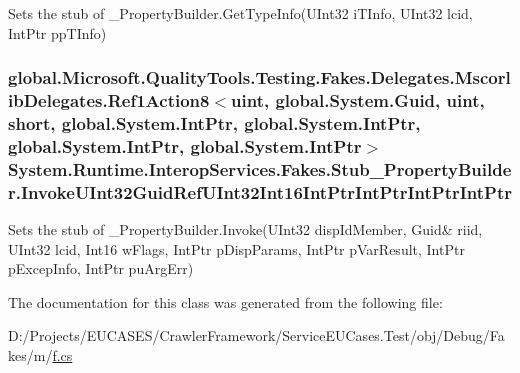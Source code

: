 Sets the stub of \-\_\-\-Property\-Builder.\-Get\-Type\-Info(\-U\-Int32 i\-T\-Info, U\-Int32 lcid, Int\-Ptr pp\-T\-Info)

\hypertarget{class_system_1_1_runtime_1_1_interop_services_1_1_fakes_1_1_stub___property_builder_a7215419c230793c88c0b832f5a5a89f8}{
\subsubsection[{Invoke\-U\-Int32\-Guid\-Ref\-U\-Int32\-Int16\-Int\-Ptr\-Int\-Ptr\-Int\-Ptr\-Int\-Ptr}]{\setlength{\rightskip}{0pt plus 5cm}global.\-Microsoft.\-Quality\-Tools.\-Testing.\-Fakes.\-Delegates.\-Mscorlib\-Delegates.\-Ref1\-Action8$<$uint, global.\-System.\-Guid, uint, short, global.\-System.\-Int\-Ptr, global.\-System.\-Int\-Ptr, global.\-System.\-Int\-Ptr, global.\-System.\-Int\-Ptr$>$ System.\-Runtime.\-Interop\-Services.\-Fakes.\-Stub\-\_\-\-Property\-Builder.\-Invoke\-U\-Int32\-Guid\-Ref\-U\-Int32\-Int16\-Int\-Ptr\-Int\-Ptr\-Int\-Ptr\-Int\-Ptr}}\label{class_system_1_1_runtime_1_1_interop_services_1_1_fakes_1_1_stub___property_builder_a7215419c230793c88c0b832f5a5a89f8}


Sets the stub of \-\_\-\-Property\-Builder.\-Invoke(U\-Int32 disp\-Id\-Member, Guid\& riid, U\-Int32 lcid, Int16 w\-Flags, Int\-Ptr p\-Disp\-Params, Int\-Ptr p\-Var\-Result, Int\-Ptr p\-Excep\-Info, Int\-Ptr pu\-Arg\-Err)



The documentation for this class was generated from the following file\-:\begin{DoxyCompactItemize}
\item 
D\-:/\-Projects/\-E\-U\-C\-A\-S\-E\-S/\-Crawler\-Framework/\-Service\-E\-U\-Cases.\-Test/obj/\-Debug/\-Fakes/m/\hyperlink{m_2f_8cs}{f.\-cs}\end{DoxyCompactItemize}

